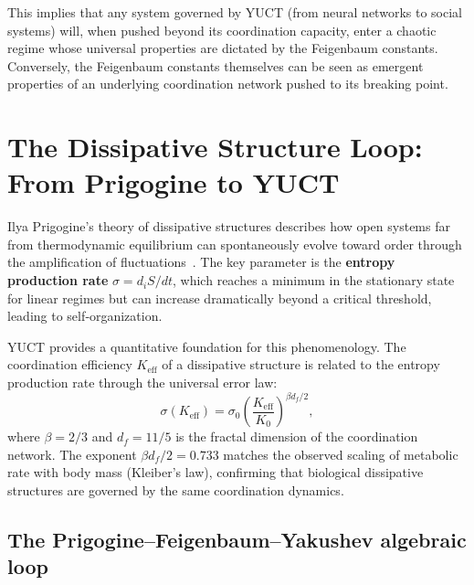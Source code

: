 \documentclass[12pt,a4paper]{article}
\newcommand{\Keff}{K_{\mathrm{eff}}}
\begin{document}
{	This implies that any system governed by YUCT (from neural networks to social systems) will, when pushed beyond its coordination capacity, enter a chaotic regime whose universal properties are dictated by the Feigenbaum constants. Conversely, the Feigenbaum constants themselves can be seen as emergent properties of an underlying coordination network pushed to its breaking point.
	
\section{The Dissipative Structure Loop: From Prigogine to YUCT}
\label{sec:prigogine}

Ilya Prigogine's theory of dissipative structures describes how open systems far from
thermodynamic equilibrium can spontaneously evolve toward order through the amplification
of fluctuations~\cite{Prigogine1977}.  The key parameter is the \textbf{entropy production
	rate} $\sigma = d_iS/dt$, which reaches a minimum in the stationary state for linear
regimes but can increase dramatically beyond a critical threshold, leading to
self‑organization.

YUCT provides a quantitative foundation for this phenomenology.  The coordination
efficiency $K_{\mathrm{eff}}$ of a dissipative structure is related to the entropy
production rate through the universal error law:
\begin{equation}
	\sigma(\Keff) = \sigma_0 \left( \frac{\Keff}{K_0} \right)^{\beta d_f / 2},
	\label{eq:sigma-keff}
\end{equation}
where $\beta = 2/3$ and $d_f = 11/5$ is the fractal dimension of the coordination network.
The exponent $\beta d_f / 2 = 0.733$ matches the observed scaling of metabolic rate with
body mass (Kleiber's law), confirming that biological dissipative structures are governed
by the same coordination dynamics.

\subsection{The Prigogine--Feigenbaum--Yakushev algebraic loop}

}
\end{document}
